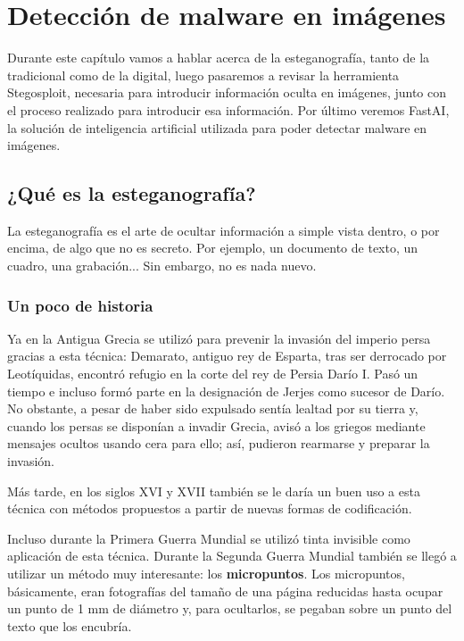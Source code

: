 \chapter{Detección de malware en imágenes}
\label{ch:det_mal}

Durante este capítulo vamos a hablar acerca de la esteganografía, tanto de la tradicional como de la digital, luego pasaremos a revisar la herramienta Stegosploit, necesaria para introducir información oculta en imágenes, junto con el proceso realizado para introducir esa información. Por último veremos FastAI, la solución de inteligencia artificial utilizada para poder detectar malware en imágenes.

\section{¿Qué es la esteganografía?}

La esteganografía es el arte de ocultar información a simple vista dentro, o por encima, de algo que no es secreto. Por ejemplo, un documento de texto, un cuadro, una grabación... Sin embargo, no es nada nuevo.%

\subsection{Un poco de historia}

Ya en la Antigua Grecia se utilizó para prevenir la invasión del imperio persa gracias a esta técnica: Demarato, antiguo rey de Esparta, tras ser derrocado por Leotíquidas, encontró refugio en la corte del rey de Persia Darío I. Pasó un tiempo e incluso formó parte en la designación de Jerjes como sucesor de Darío. No obstante, a pesar de haber sido expulsado sentía lealtad por su tierra y, cuando los persas se disponían a invadir Grecia, avisó a los griegos mediante mensajes ocultos usando cera para ello; así, pudieron rearmarse y preparar la invasión. %

Más tarde, en los siglos XVI y XVII también se le daría un buen uso a esta técnica con métodos propuestos a partir de nuevas formas de codificación.%

Incluso durante la Primera Guerra Mundial se utilizó tinta invisible como aplicación de esta técnica. Durante la Segunda Guerra Mundial también se llegó a utilizar un método muy interesante: los \textbf{micropuntos}. Los micropuntos, básicamente, eran fotografías del tamaño de una página reducidas hasta ocupar un punto de 1 mm de diámetro y, para ocultarlos, se pegaban sobre un punto del texto que los encubría. %

